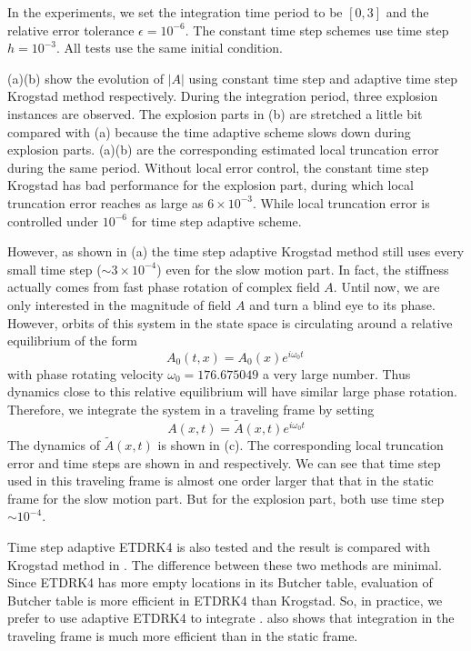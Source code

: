 In the experiments, we set the integration time period to be $[0, 3]$ and the
relative error tolerance $\epsilon=10^{-6}$. The constant time step schemes use
time step $h=10^{-3}$. All tests use the same initial condition.

 (a)(b) show the evolution of $|A|$ using
constant time step and adaptive time step Krogstad method respectively.
During the integration period, three explosion instances are observed. The
explosion parts in (b) are stretched a little bit compared with (a) because the
time adaptive scheme slows down during explosion parts.
 (a)(b) are the corresponding estimated local truncation
error during the same period. Without local error control, the constant time step
Krogstad has bad performance for the explosion part, during which local truncation
error reaches as large as $6\times 10^{-3}$. While local truncation
error is controlled under $10^{-6}$ for time step adaptive scheme.

However, as shown in (a) the time step adaptive Krogstad
method still uses every small time step ($\sim 3\times 10^{-4}$)
even for the slow motion part. In fact, the stiffness actually comes from fast phase
rotation of complex field $A$. Until now, we are only interested in the magnitude
of field $A$ and turn a blind eye to its phase. However, orbits of this system in
the state space is circulating around a relative equilibrium of the form
\[
  A_0(t, x) = A_0(x)e^{i\omega_0 t}
  \,
\]
with phase rotating velocity $\omega_0 =176.675049$ a very large number. Thus dynamics
close to this relative equilibrium will have similar large phase rotation.
Therefore, we integrate the system in a traveling frame by setting
\[
  A(x, t) = \tilde{A}(x, t)e^{i\omega_0 t}
\]
The dynamics of $\tilde{A}(x, t)$ is shown in (c). The
corresponding local truncation error and time steps are shown in
 and  respectively. We can see that
time step used in this traveling frame is almost one order larger that that in the
static frame for the slow motion part. But for the explosion part, both use time
step $\sim 10^{-4}$.

Time step adaptive ETDRK4 is also tested and the result is compared with
Krogstad method in . The difference between these two
methods are minimal. Since ETDRK4 has more empty locations in its Butcher
table, evaluation of Butcher table is more efficient in ETDRK4 than Krogstad.
So, in practice, we prefer to use adaptive ETDRK4 to integrate \cqcGLe.
 also shows that integration in the traveling frame is
much more efficient than in the static frame.

